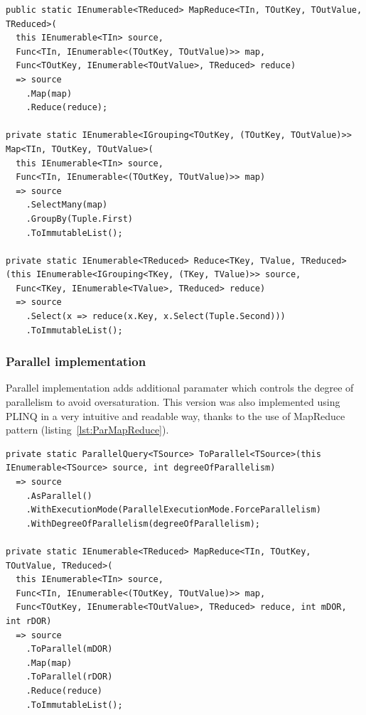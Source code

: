 \begin{lstlisting}[language={[sharp]c}, style=sharpcstyle, caption={Sequential MapReduce implementation}, label={lst:SeqMapReduce},
numbers=none, xleftmargin=0pt,framexleftmargin=0pt,framexrightmargin=0pt,framexbottommargin=0pt]
public static IEnumerable<TReduced> MapReduce<TIn, TOutKey, TOutValue, TReduced>(
  this IEnumerable<TIn> source,
  Func<TIn, IEnumerable<(TOutKey, TOutValue)>> map,
  Func<TOutKey, IEnumerable<TOutValue>, TReduced> reduce)
  => source
    .Map(map)
    .Reduce(reduce);

private static IEnumerable<IGrouping<TOutKey, (TOutKey, TOutValue)>> Map<TIn, TOutKey, TOutValue>(
  this IEnumerable<TIn> source,
  Func<TIn, IEnumerable<(TOutKey, TOutValue)>> map)
  => source
    .SelectMany(map)
    .GroupBy(Tuple.First)
    .ToImmutableList();

private static IEnumerable<TReduced> Reduce<TKey, TValue, TReduced>
(this IEnumerable<IGrouping<TKey, (TKey, TValue)>> source,
  Func<TKey, IEnumerable<TValue>, TReduced> reduce)
  => source
    .Select(x => reduce(x.Key, x.Select(Tuple.Second)))
    .ToImmutableList();

\end{lstlisting}

\subsubsection{Parallel implementation}
Parallel implementation adds additional paramater which controls the degree of parallelism to avoid oversaturation. This version was also implemented using PLINQ in a very intuitive and readable way, thanks to the use of MapReduce pattern (listing~\ref{lst:ParMapReduce}).

\begin{lstlisting}[language={[sharp]c}, style=sharpcstyle, caption={Parallel MapReduce implementation}, label={lst:ParMapReduce},
numbers=none, xleftmargin=0pt,framexleftmargin=0pt,framexrightmargin=0pt,framexbottommargin=0pt]
private static ParallelQuery<TSource> ToParallel<TSource>(this IEnumerable<TSource> source, int degreeOfParallelism)
  => source
    .AsParallel()
    .WithExecutionMode(ParallelExecutionMode.ForceParallelism)
    .WithDegreeOfParallelism(degreeOfParallelism);

private static IEnumerable<TReduced> MapReduce<TIn, TOutKey, TOutValue, TReduced>(
  this IEnumerable<TIn> source,
  Func<TIn, IEnumerable<(TOutKey, TOutValue)>> map,
  Func<TOutKey, IEnumerable<TOutValue>, TReduced> reduce, int mDOR, int rDOR)
  => source
    .ToParallel(mDOR)
    .Map(map)
    .ToParallel(rDOR)
    .Reduce(reduce)
    .ToImmutableList();
\end{lstlisting}

